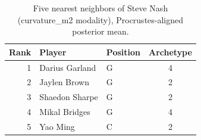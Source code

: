 \begin{table}[htbp]
  \centering\small
  \begin{tabular}{rllc}
    \toprule
    Rank & Player & Position & Archetype \\
    \midrule
    1 & Darius Garland & G & 4 \\
    2 & Jaylen Brown & G & 2 \\
    3 & Shaedon Sharpe & G & 2 \\
    4 & Mikal Bridges & G & 4 \\
    5 & Yao Ming & C & 2 \\
    \bottomrule
  \end{tabular}
  \caption{Five nearest neighbors of Steve Nash (curvature_m2 modality), Procrustes-aligned posterior mean.}
  \label{tab:Steve_Nash_neighbors_curvature_m2}
\end{table}

